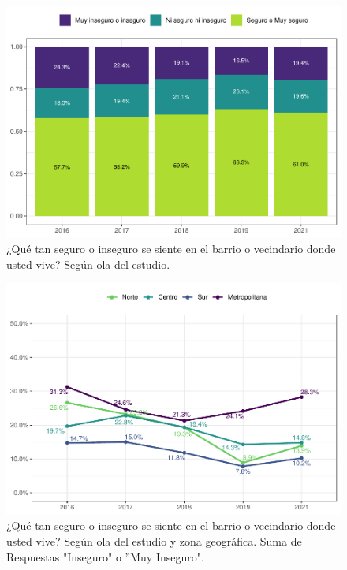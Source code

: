 \documentclass[
  12pt,
  openany]{book}
\begin{document}
\begin{figure}

{\centering \includegraphics{reporte-elsoc_files/figure-latex/seguri-ola-1} 

}

\caption{¿Qué tan seguro o inseguro se siente en el barrio o vecindario donde usted vive? Según ola del estudio.}\label{fig:seguri-ola}
\end{figure}

\begin{figure}

{\centering \includegraphics{reporte-elsoc_files/figure-latex/seguri-zona-1} 

}

\caption{¿Qué tan seguro o inseguro se siente en el barrio o vecindario donde usted vive? Según ola del estudio y zona geográfica. Suma de Respuestas "Inseguro" o ”Muy Inseguro".}\label{fig:seguri-zona}
\end{figure}
\end{document}

